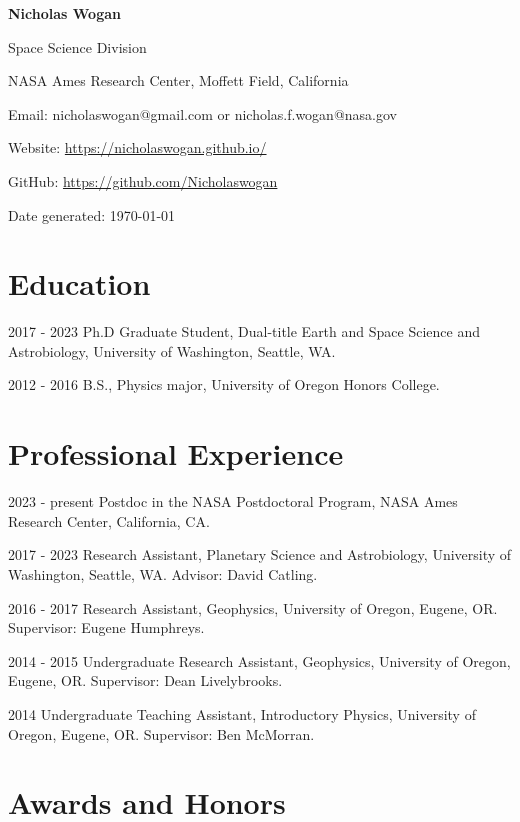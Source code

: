 \documentclass{article}
\begin{document}
\begin{center}
\textbf{Nicholas Wogan}

Space Science Division

NASA Ames Research Center, Moffett Field, California

Email: nicholaswogan@gmail.com or nicholas.f.wogan@nasa.gov

Website: \url{https://nicholaswogan.github.io/}

GitHub: \url{https://github.com/Nicholaswogan}

Date generated: \today

\end{center}

\section{Education}

\begin{cvlist}
\item[2017 - 2023]
  Ph.D Graduate Student, Dual-title Earth and Space Science and Astrobiology, University of Washington, Seattle, WA.
\item[2012 - 2016]
  B.S., Physics major, University of Oregon Honors College.
\end{cvlist}

\section{Professional Experience}

\begin{cvlist}
\item[2023 - present]
  Postdoc in the NASA Postdoctoral Program, NASA Ames Research Center, California, CA.
\item[2017 - 2023]
  Research Assistant, Planetary Science and Astrobiology, University of Washington, Seattle, WA. Advisor: David Catling.
\item[2016 - 2017]
  Research Assistant, Geophysics, University of Oregon, Eugene, OR. Supervisor: Eugene Humphreys.
\item[2014 - 2015]
  Undergraduate Research Assistant, Geophysics, University of Oregon, Eugene, OR. Supervisor: Dean Livelybrooks.
\item[2014] 
  Undergraduate Teaching Assistant, Introductory Physics, University of Oregon, Eugene, OR. Supervisor: Ben McMorran.
\end{cvlist}

\section{Awards and Honors}
\end{document}
